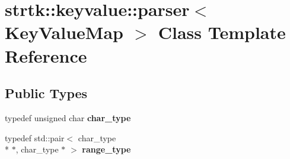 \hypertarget{classstrtk_1_1keyvalue_1_1parser}{\section{strtk\-:\-:keyvalue\-:\-:parser$<$ Key\-Value\-Map $>$ Class Template Reference}
\label{classstrtk_1_1keyvalue_1_1parser}
}
\subsection*{Public Types}
\begin{DoxyCompactItemize}
\item 
\hypertarget{classstrtk_1_1keyvalue_1_1parser_abd76c940f5a4fefe824da214508f3401}{typedef unsigned char {\bfseries char\-\_\-type}}\label{classstrtk_1_1keyvalue_1_1parser_abd76c940f5a4fefe824da214508f3401}

\item 
\hypertarget{classstrtk_1_1keyvalue_1_1parser_a9a40a018d668c4c49248a74f2161a559}{typedef std\-::pair$<$ char\-\_\-type \\*
$\ast$, char\-\_\-type $\ast$ $>$ {\bfseries range\-\_\-type}}\label{classstrtk_1_1keyvalue_1_1parser_a9a40a018d668c4c49248a74f2161a559}

\end{DoxyCompactItemize}
